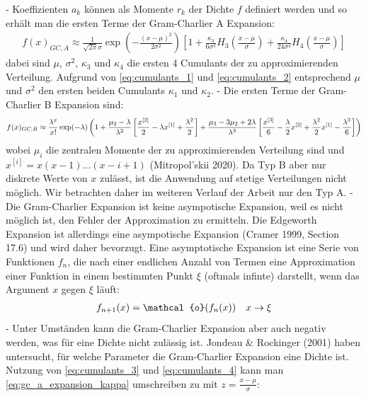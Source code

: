 - Koeffizienten $a_k$ können als Momente $r_k$ der Dichte $f$ definiert werden und so erhält man die ersten Terme der Gram-Charlier A Expansion:
\begin{align}
    \label{eq:gc_a_expansion_kappa}
    f(x)_{GC,A} \approx \frac{1}{\sqrt{2\pi}\sigma}\exp\left(-\frac{(x-\mu)^2}{2\sigma^2}\right) \left[1 + \frac{\kappa_3}{6\sigma^3}H_3\left(\frac{x-\mu}{\sigma}\right) + \frac{\kappa_4}{24\sigma^4}H_4\left(\frac{x-\mu}{\sigma}\right)\right]
\end{align}
dabei sind $\mu$, $\sigma^2$, $\kappa_3$ und $\kappa_4$ die ersten 4 Cumulants der zu approximierenden Verteilung. Aufgrund von \eqref{eq:cumulants_1} und \eqref{eq:cumulants_2} entsprechend $\mu$ und $\sigma^2$ den ersten beiden Cumulants $\kappa_1$ und $\kappa_2$.
- Die ersten Terme der Gram-Charlier B Expansion sind:
\begin{align}
    f(x)_{GC,B} \approx \frac{\lambda^x}{x!}\exp(-\lambda) \left(1 + \frac{\mu_2 - \lambda}{\lambda^2}\left[\frac{x^{[2]}}{2} - \lambda x^{[1]} + \frac{\lambda^2}{2}\right] + \frac{\mu_3 - 3\mu_2 + 2\lambda}{\lambda^3}\left[\frac{x^{[3]}}{6} - \frac{\lambda}{2}x^{[2]} + \frac{\lambda^2}{2}x^{[1]} - \frac{\lambda^3}{6}\right]\right) \notag
\end{align}
wobei $\mu_i$ die zentralen Momente der zu approximierenden Verteilung sind und $x^{[i]} = x(x-1)\dots (x-i+1)$ (Mitropol'skii 2020). Da Typ B aber nur diskrete Werte von $x$ zulässt, ist die Anwendung auf stetige Verteilungen nicht möglich. Wir betrachten daher im weiteren Verlauf der Arbeit nur den Typ A.
- Die Gram-Charlier Expansion ist keine asympotische Expansion, weil es nicht möglich ist, den Fehler der Approximation zu ermitteln. Die Edgeworth Expansion ist allerdings eine asympotische Expansion (Cramer 1999, Section 17.6) und wird daher bevorzugt. Eine asymptotische Expansion ist eine Serie von Funktionen $f_n$, die nach einer endlichen Anzahl von Termen eine Approximation einer Funktion in einem bestimmten Punkt $\xi$ (oftmals infinte) darstellt, wenn das Argument $x$ gegen $\xi$ läuft:
\begin{align}
    f_{n+1}(x) = \mathcal{o}(f_n(x)) \quad x\to\xi \notag
\end{align}
- Unter Umständen kann die Gram-Charlier Expansion aber auch negativ werden, was für eine Dichte nicht zulässig ist. Jondeau & Rockinger (2001) haben untersucht, für welche Parameter die Gram-Charlier Expansion eine Dichte ist. Nutzung von \eqref{eq:cumulants_3} und \eqref{eq:cumulants_4} kann man \eqref{eq:gc_a_expansion_kappa} umschreiben zu mit $z = \frac{x-\mu}{\sigma}$:
